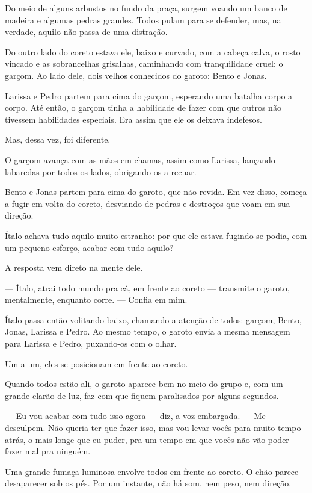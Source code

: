 Do meio de alguns arbustos no fundo da praça, surgem voando um banco de madeira e algumas pedras grandes.  
Todos pulam para se defender, mas, na verdade, aquilo não passa de uma distração.

Do outro lado do coreto estava ele, baixo e curvado, com a cabeça calva, o rosto vincado e as sobrancelhas grisalhas, caminhando com tranquilidade cruel: o garçom.
Ao lado dele, dois velhos conhecidos do garoto: Bento e Jonas.

Larissa e Pedro partem para cima do garçom, esperando uma batalha corpo a corpo.  
Até então, o garçom tinha a habilidade de fazer com que outros não tivessem habilidades especiais.  
Era assim que ele os deixava indefesos.

Mas, dessa vez, foi diferente.

O garçom avança com as mãos em chamas, assim como Larissa, lançando labaredas por todos os lados, obrigando-os a recuar.

Bento e Jonas partem para cima do garoto, que não revida.  
Em vez disso, começa a fugir em volta do coreto, desviando de pedras e destroços que voam em sua direção.

Ítalo achava tudo aquilo muito estranho: por que ele estava fugindo se podia, com um pequeno esforço, acabar com tudo aquilo?

A resposta vem direto na mente dele.

— Ítalo, atrai todo mundo pra cá, em frente ao coreto — transmite o garoto, mentalmente, enquanto corre. — Confia em mim.

Ítalo passa então volitando baixo, chamando a atenção de todos: garçom, Bento, Jonas, Larissa e Pedro.  
Ao mesmo tempo, o garoto envia a mesma mensagem para Larissa e Pedro, puxando-os com o olhar.

Um a um, eles se posicionam em frente ao coreto.

Quando todos estão ali, o garoto aparece bem no meio do grupo e, com um grande clarão de luz, faz com que fiquem paralisados por alguns segundos.

— Eu vou acabar com tudo isso agora — diz, a voz embargada. — Me desculpem.  
Não queria ter que fazer isso, mas vou levar vocês para muito tempo atrás, o mais longe que eu puder, pra um tempo em que vocês não vão poder fazer mal pra ninguém.

Uma grande fumaça luminosa envolve todos em frente ao coreto.  
O chão parece desaparecer sob os pés.  
Por um instante, não há som, nem peso, nem direção.

